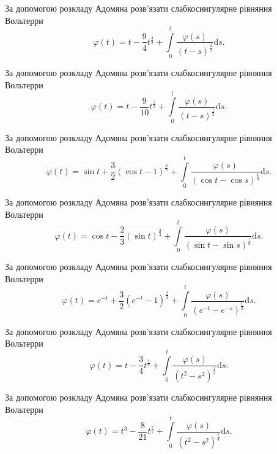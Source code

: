 \documentclass[12pt]{extarticle}
\begin{document}
\begin{Exercise}
За допомогою розкладу Адомяна розв’язати слабкосингулярне рівняння Вольтерри \[\varphi(t) = t - \dfrac{9}{4} t^{\frac{4}{3}} + \int\limits_{0}^{t} \dfrac{\varphi(s)}{(t - s)^\frac{2}{3}} \mathrm{d}s.\]
\end{Exercise}

\begin{Exercise}
За допомогою розкладу Адомяна розв’язати слабкосингулярне рівняння Вольтерри \[\varphi(t) = t - \dfrac{9}{10} t^{\frac{5}{3}} + \int\limits_{0}^{t} \dfrac{\varphi(s)}{(t - s)^\frac{1}{3}} \mathrm{d}s.\]
\end{Exercise}

\begin{Exercise}
За допомогою розкладу Адомяна розв’язати слабкосингулярне рівняння Вольтерри \[\varphi(t) = \sin t + \dfrac{3}{2}\left(\cos t - 1\right)^{\frac{2}{3}} + \int\limits_{0}^{t} \dfrac{\varphi(s)}{(\cos t - \cos s)^\frac{1}{3}} \mathrm{d}s.\]
\end{Exercise}

\begin{Exercise}
За допомогою розкладу Адомяна розв’язати слабкосингулярне рівняння Вольтерри \[\varphi(t) = \cos t - \dfrac{2}{3}\left(\sin t\right)^{\frac{2}{3}} + \int\limits_{0}^{t} \dfrac{\varphi(s)}{(\sin t - \sin s)^\frac{1}{3}} \mathrm{d}s.\]
\end{Exercise}

\begin{Exercise}
За допомогою розкладу Адомяна розв’язати слабкосингулярне рівняння Вольтерри \[\varphi(t) = e^{-t} + \dfrac{3}{2}\left(e^{-t} - 1\right)^{\frac{2}{3}} + \int\limits_{0}^{t} \dfrac{\varphi(s)}{(e^{-t} - e^{-s})^\frac{1}{3}} \mathrm{d}s.\]
\end{Exercise}

\begin{Exercise}
За допомогою розкладу Адомяна розв’язати слабкосингулярне рівняння Вольтерри \[\varphi(t) = t - \dfrac{3}{4} t^{\frac{4}{3}} + \int\limits_{0}^{t} \dfrac{\varphi(s)}{(t^2 - s^2)^\frac{1}{3}} \mathrm{d}s.\]
\end{Exercise}

\begin{Exercise}
За допомогою розкладу Адомяна розв’язати слабкосингулярне рівняння Вольтерри \[\varphi(t) = t^3 - \dfrac{8}{21}t^{\frac{7}{2}} + \int\limits_{0}^{t} \dfrac{\varphi(s)}{(t^2 - s^2)^\frac{1}{4}} \mathrm{d}s.\]
\end{Exercise}
\end{document}
